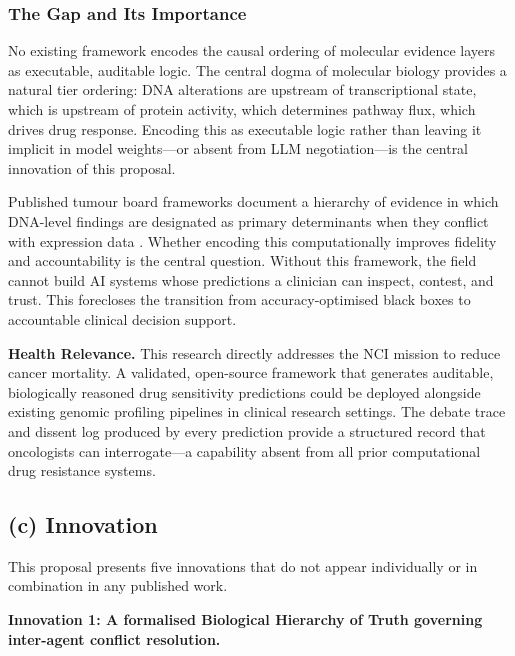\documentclass[11pt,letterpaper]{article}
\begin{document}
\subsubsection{The Gap and Its Importance}

No existing framework encodes the causal ordering of molecular evidence layers as executable,
auditable logic. The central dogma of molecular biology provides a natural tier ordering: DNA
alterations are upstream of transcriptional state, which is upstream of protein activity, which
determines pathway flux, which drives drug response. Encoding this as executable logic rather
than leaving it implicit in model weights---or absent from LLM negotiation---is the central
innovation of this proposal.

Published tumour board frameworks document a hierarchy of evidence in which DNA-level
findings are designated as primary determinants when they conflict with expression data
\cite{ref12,ref18}. Whether encoding this computationally improves fidelity and accountability
is the central question. Without this framework, the field cannot build AI systems whose
predictions a clinician can inspect, contest, and trust. This forecloses the transition from
accuracy-optimised black boxes to accountable clinical decision support.

\textbf{Health Relevance.} This research directly addresses the NCI mission to reduce cancer
mortality. A validated, open-source framework that generates auditable, biologically reasoned
drug sensitivity predictions could be deployed alongside existing genomic profiling pipelines in
clinical research settings. The debate trace and dissent log produced by every prediction provide
a structured record that oncologists can interrogate---a capability absent from all prior
computational drug resistance systems.

\subsection{(c) Innovation}

This proposal presents five innovations that do not appear individually or in combination in
any published work.

\textbf{Innovation 1: A formalised Biological Hierarchy of Truth governing inter-agent conflict resolution.}
\end{document}
